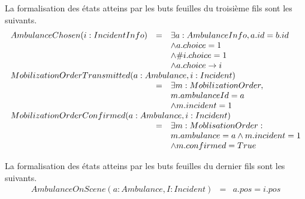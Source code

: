 	La formalisation des états atteins par les buts feuilles du troisième fils sont
	les suivants.	
	\begin{equation*}
		\begin{array}{rcl}
			AmbulanceChosen(i:IncidentInfo)  
			& = & \exists a:AmbulanceInfo, a.id = b.id  \\
			&   & \wedge a.choice = 1 \\
			&   & \wedge \#i.choice = 1 \\
			&   & \wedge a.choice \rightarrow i \\
			
			\multicolumn{3}{l}{MobilizationOrderTransmitted(a: Ambulance, i:Incident)} \\ 
			& = & \exists m: MobilizationOrder, \\
			&   & m.ambulanceId = a \\
			&   & \wedge m.incident = 1 \\
			
			\multicolumn{3}{l}{MobilizationOrderConfirmed(a:Ambulance, i:Incident)} \\ 
			& = & \exists m:MoblisationOrder: \\
			&   & m.ambulance = a \wedge m.incident = 1 \\
			&   & \wedge m.confirmed = True \\
		\end{array}
	\end{equation*}
	
	La formalisation des états atteins par les buts feuilles du dernier fils sont
	les suivants.		
	\begin{equation*}
		\begin{array}{rcl}
			AmbulanceOnScene(a:Ambulance, I:Incident)
			& = & a.pos = i.pos \\
		\end{array}
	\end{equation*}


